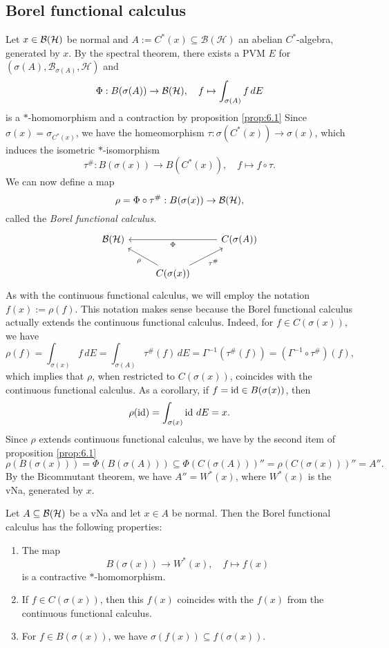 \subsection{Borel functional calculus}

Let $x \in \operatorname{\mathcal{B} (\mathcal{H})}$ be normal and $A := C^* (x) \subseteq \mathcal{B}(\mathcal{H})$ an abelian $C^*$-algebra, generated by $x$.
By the spectral theorem, there exists a PVM $E$ for $(\sigma(A), \mathcal{B}_{\sigma(A)}, \mathcal{H})$ 
and 
$$\Phi: B (\sigma(A)) \to \operatorname{\mathcal{B} (\mathcal{H})},\quad f \mapsto \int_{\sigma(A)} f\, dE$$
is a $*$-homomorphism and a contraction by proposition \ref{prop:6.1}
Since $\sigma(x) = \sigma_{C^* (x)}$, we have the homeomorphism $\tau: \sigma(C^* (x)) \to \sigma(x)$, which induces
the isometric $*$-isomorphism 
$$\tau^{\#}: B(\sigma(x)) \to B(C^* (x)),\quad f \mapsto f \circ \tau.$$
We can now define a map 
$$\rho = \Phi \circ \tau^{\#}: B(\sigma(x)) \to \operatorname{\mathcal{B} (\mathcal{H})},$$
called the \emph{Borel functional calculus}. 
\[\begin{tikzcd}
	{\bh} && {C(\sigma(A))} \\
	& {C(\sigma(x))}
	\arrow["{\tau^{\#}}"', from=2-2, to=1-3]
	\arrow["\rho", from=2-2, to=1-1]
	\arrow["\Phi", from=1-3, to=1-1]
\end{tikzcd}\]
As with the continuous functional calculus, we will employ the notation $f(x) := \rho(f)$.
This notation makes sense because the Borel functional calculus actually extends the continuous functional calculus.
Indeed, for $f \in C(\sigma(x))$, we have
$$\rho (f) = \int_{\sigma(x)} f\, dE = \int_{\sigma(A)} \tau^{\#}(f)\, dE = \Gamma^{-1} (\tau^{\#}(f)) = (\Gamma^{-1} \circ \tau^{\#})(f),$$
which implies that $\rho$, when restricted to $C(\sigma(x))$, coincides with the continuous functional calculus.
As a corollary, if $f = \operatorname{id} \in B(\sigma(x))$, then 
$$\rho (\operatorname{id}) = \int_{\sigma (x)} \operatorname{id} \, dE = x.$$
Since $\rho$ extends continuous functional calculus, we have by the second item of proposition \ref{prop:6.1}
$$\rho (B(\sigma(x))) = \Phi (B(\sigma(A))) \subseteq \Phi (C(\sigma(A)))'' = \rho (C(\sigma(x)))'' = A''.$$
By the Bicommutant theorem, we have $A'' = W^*(x)$, where $W^* (x)$ is the vNa, generated by $x$.

\begin{theorem}
  Let $A \subseteq \operatorname{\mathcal{B} (\mathcal{H})}$ be a vNa and let $x \in A$ be normal.
  Then the Borel functional calculus has the following properties:
  \begin{enumerate}
    \item The map $$B (\sigma(x)) \to W^*(x),\quad f \mapsto f(x)$$
    is a contractive $*$-homomorphism.
    \item If $f \in C(\sigma(x))$, then this $f(x)$ coincides with the $f(x)$ from the continuous functional calculus.
    \item For $f \in B (\sigma(x))$, we have $\sigma(f(x)) \subseteq f(\sigma(x))$.
  \end{enumerate}
\end{theorem}


